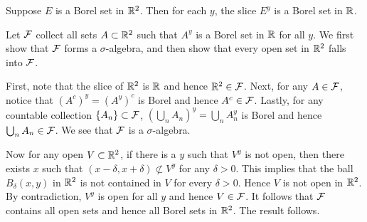 \begin{exercise}
    Suppose $E$ is a Borel set in $\mathbb{R}^2$. Then for each $y$, the 
    slice $E^y$ is a Borel set in $\mathbb{R}$.
\end{exercise}
\begin{pf}
    Let $\mathcal{F}$ collect all sets $A\subset \mathbb{R}^2$ such that $A^y$ is a Borel 
    set in $\mathbb{R}$ for all $y$. We first show that $\mathcal{F}$ forms a $\sigma$-algebra, 
    and then show that every open set in $\mathbb{R}^2$ falls into $\mathcal{F}$. 

    First, note that the slice of $\mathbb{R}^2$ is $\mathbb{R}$ and hence $\mathbb{R}^2\in\mathcal{F}$. Next, 
    for any $A\in\mathcal{F}$, notice that $(A^c)^y = (A^y)^c$ is Borel and hence 
    $A^c\in\mathcal{F}$. Lastly, for any countable collection $\left\{ {A_n} \right\}\subset\mathcal{F}$, 
    $(\bigcup_n A_n)^y = \bigcup_n A_n^y$ is Borel and hence $\bigcup_n A_n\in\mathcal{F}$. 
    We see that $\mathcal{F}$ is a $\sigma$-algebra. 

    Now for any open $V\subset\mathbb{R}^2$, if there is a $y$ such that $V^y$ is not 
    open, then there exists $x$ such that $(x-\delta, x+\delta)\not\subset V^y$ 
    for any $\delta>0$. This implies that the ball $B_\delta(x,y)$ in $\mathbb{R}^2$ 
    is not contained in $V$ for every $\delta>0$. Hence $V$ is not open in $\mathbb{R}^2$. 
    By contradiction, $V^y$ is open for all $y$ and hence $V\in\mathcal{F}$. It follows 
    that $\mathcal{F}$ contains all open sets and hence all Borel sets in $\mathbb{R}^2$. The 
    result follows.
\end{pf}

